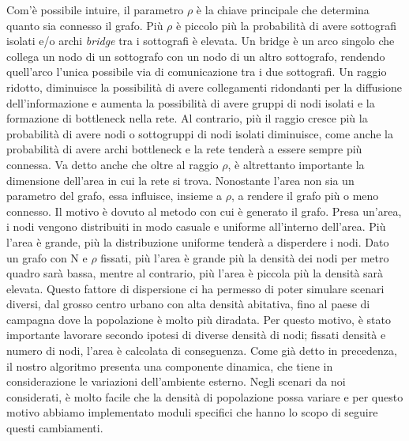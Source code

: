 Com'è possibile intuire, il parametro $\rho$ è la chiave principale che determina quanto sia connesso il grafo. Più $\rho$ è piccolo più la probabilità di avere sottografi isolati e/o archi \textit{bridge} tra i sottografi è elevata. Un bridge è un arco singolo che collega un nodo di un sottografo con un nodo di un altro sottografo, rendendo quell'arco l'unica possibile via di comunicazione tra i due sottografi. Un raggio ridotto, diminuisce la possibilità di avere collegamenti ridondanti per la diffusione dell'informazione e aumenta la possibilità di avere gruppi di nodi isolati e la formazione di bottleneck nella rete. Al contrario, più il raggio cresce più la probabilità di avere nodi o sottogruppi di nodi isolati diminuisce, come anche la probabilità di avere archi bottleneck e la rete tenderà a essere sempre più connessa. Va detto anche che oltre al raggio $\rho$, è altrettanto importante la dimensione dell'area in cui la rete si trova. Nonostante l'area non sia un parametro del grafo, essa influisce, insieme a $\rho$, a rendere il grafo più o meno connesso. Il motivo è dovuto al metodo con cui è generato il grafo. Presa un'area, i nodi vengono distribuiti in modo casuale e uniforme all'interno dell'area. Più l'area è grande, più la distribuzione uniforme tenderà a disperdere i nodi. Dato un grafo con N e $\rho$ fissati, più l'area è grande più la densità dei nodi per metro quadro sarà bassa, mentre al contrario, più l'area è piccola più la densità sarà elevata. Questo fattore di dispersione ci ha permesso di poter simulare scenari diversi, dal grosso centro urbano con alta densità abitativa, fino al paese di campagna dove la popolazione è molto più diradata. Per questo motivo, è stato importante lavorare secondo ipotesi di diverse densità di nodi; fissati densità e numero di nodi, l'area è calcolata di conseguenza. Come già detto in precedenza, il nostro algoritmo presenta una componente dinamica, che tiene in considerazione le variazioni dell'ambiente esterno. Negli scenari da noi considerati, è molto facile che la densità di popolazione possa variare e per questo motivo abbiamo implementato moduli specifici che hanno lo scopo di seguire questi cambiamenti.

